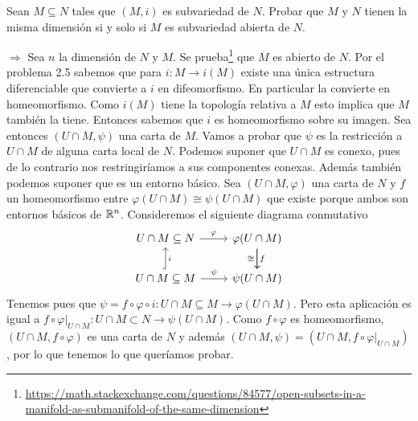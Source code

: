 \documentclass[twoside]{article}
\newcounter{ejercicio}
\begin{document}
\begin{ejercicio}{14}
Sean $M \subseteq N$ tales que $(M, i)$ es subvariedad de $N$. Probar que $M$ y $N$
tienen la misma dimensión si y solo si $M$ es subvariedad abierta de $N$.
\end{ejercicio}
\begin{solucion}
$\boxed{\Rightarrow}$ Sea $n$ la dimensión de $N$ y $M$. Se prueba\footnote{\url{https://math.stackexchange.com/questions/84577/open-subsets-in-a-manifold-as-submanifold-of-the-same-dimension}} que $M$ es abierto de $N$. Por el problema 2.5 sabemos que para $i:M\to i(M)$ existe una única estructura diferenciable que convierte a $i$ en difeomorfismo. En particular la convierte en homeomorfismo. Como $i(M)$ tiene la topología relativa a $M$ esto implica que $M$ también la tiene. Entonces sabemos que $i$ es homeomorfismo sobre su imagen. Sea entonces $(U\cap M,\psi)$ una carta de $M$. Vamos a probar que $\psi$ es la restricción a $U\cap M$ de alguna carta local de $N$. Podemos suponer que $U\cap M$ es conexo, pues de lo contrario nos restringiríamos a sus componentes conexas. Además también podemos suponer que es un entorno básico. Sea $(U\cap M,\varphi)$ una carta de $N$ y $f$ un homeomorfismo entre $\varphi(U\cap M)\cong\psi(U\cap M)$ que existe porque ambos son entornos básicos de $\mathbb{R}^n$. Consideremos el siguiente diagrama conmutativo
\[
\begin{tikzcd}
U\cap M\subseteq N\arrow[r,"\varphi"] & \varphi(U\cap M)\arrow[d,"f"]\arrow[d,"\cong"']\\
U\cap M\subseteq M\arrow[u,hookrightarrow, "i"']\arrow[r,"\psi"]& \psi(U\cap M)
\end{tikzcd}
\]
Tenemos pues que $\psi=f\circ\varphi\circ i: U\cap M\subseteq M\to\varphi(U\cap M)$. Pero esta aplicación es igual a $f\circ\varphi|_{U\cap M}:U\cap M\subset N\to\psi(U\cap M)$. Como $f\circ\varphi$ es homeomorfismo, $(U\cap M,f\circ\varphi)$ es una carta de $N$ y además $(U\cap M,\psi)=(U\cap M,f\circ\varphi|_{U\cap M})$, por lo que tenemos lo que queríamos probar.


\end{solucion}
\end{document}
